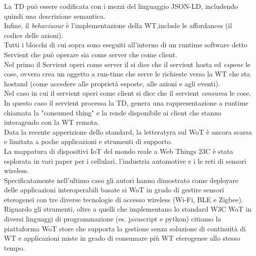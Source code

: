 \documentclass[11pt]{article}
\begin{document}
 	La TD può essere codificata con i mezzi del linguaggio JSON-LD, includendo quindi una descrizione semantica. \\
 	Infine, il \textit{behaviuour} è l'implementazione della WT,include le affordances (il codice delle azioni).\\
 	Tutti i blocchi di cui sopra sono eseguiti all'interno di un runtime software detto Servient che può operare sia come server che come client. \\
 	Nel primo il Servient operi come server il si dice che il servient hosta ed \textit{espone} le cose, ovvero crea un oggetto a run-time che serve le richieste verso la WT che sta hostand (come accedere alle proprietà esposte, alle azioni e agli eventi).\\
 	Nel caso in cui il servient operi come client si dice che il servient \textit{consuma} le cose. In questo caso il servient  processa la TD, genera una rappresentazione a runtime chiamata la "consumed thing" e la rende disponibile ai client che stanno interagendo con la WT remota.\\
 	Data la recente apperizione dello standard, la letteratyra sul WoT è ancora scarsa e limitata a poche applicazioni e strumenti di supporto. \\
 	La mappatura di dispositivi IoT del mondo reale a Web Things 23C è stata esplorata in vari paper per i cellulari, l'industria automotive e i le reti di sensori wireless.\\
 	Specificatamente nell'ultimo caso gli autori hanno dimostrato come deployare delle applicazioni interoperabili basate si WoT in grado di gestire sensori eterogenei con tre diverse tecnologie di accesso wireless (Wi-Fi, BLE e Zigbee). \\
 	Riguardo gli strumenti, oltre a quelli che implementano lo standard W3C WoT in diversi linguaggi di programmazione (es. javascript e python) citiamo la piattaforma WoT store che supporta la gestione senza soluzione di continuità di WT e applicazioni miste in grado di consumare più WT eterogenee allo stesso tempo.
	
\end{document}
